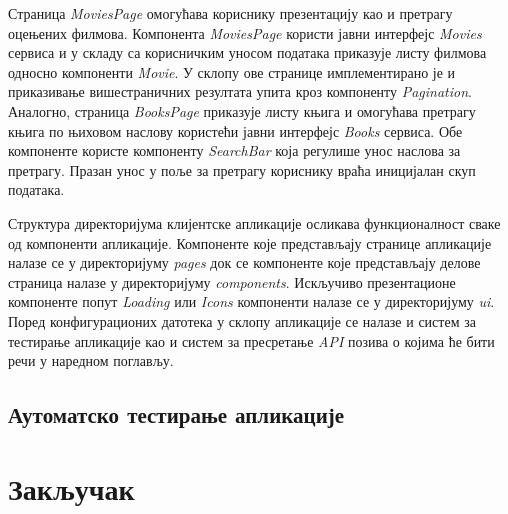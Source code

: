 \documentclass[12pt,oneside]{memoir}
\begin{document}
Страница \textit{MoviesPage} омогућава кориснику презентацију као и претрагу оцењених филмова. Компонента  \textit{MoviesPage} користи јавни интерфејс \textit{Movies} сервиса и у складу са корисничким уносом података приказује листу филмова односно компоненти \textit{Movie}.  У склопу ове странице имплементирано је и приказивање вишестраничних резултата упита кроз компоненту \textit{Pagination}. Аналогно, страница \textit{BooksPage} приказује листу књига и омогућава претрагу књига по њиховом наслову користећи јавни интерфејс \textit{Books} сервиса. Обе компоненте користе компоненту \textit{SearchBar} која регулише унос наслова за претрагу. Празан унос у поље за претрагу кориснику враћа иницијалан скуп података.

Структура директоријума клијентске апликације осликава функционалност сваке од компоненти апликације. Компоненте које представљају странице апликације налазе се у директоријуму \textit{pages} док се компоненте које представљају делове страница налазе у директоријуму \textit{components}. Искључиво презентационе компоненте попут \textit{Loading} или \textit{Icons} компоненти налазе се у директоријуму \textit{ui}. Поред конфигурационих датотека у склопу апликације се налазе и систем за тестирање апликације као и систем за пресретање \textit{API} позива о којима ће бити речи у наредном поглављу.








\section{Аутоматско тестирање апликације}


\chapter{Закључак}


\literatura

\backmatter
\end{document}

